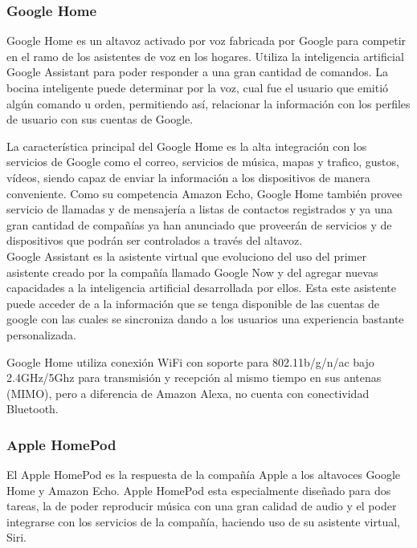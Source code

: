 \subsubsection{Google Home}
Google Home es un altavoz activado por voz fabricada por  Google para competir en el ramo de los asistentes de voz en los hogares. Utiliza la inteligencia artificial Google Assistant para poder responder a una gran cantidad de comandos.\cite{googleHome} La bocina inteligente puede determinar por la voz, cual fue el usuario que emitió algún comando u orden, permitiendo así, relacionar la información con los perfiles de usuario con sus cuentas de Google.

La característica principal del Google Home es la alta integración con los servicios de Google como el correo, servicios de música, mapas y trafico, gustos, vídeos, siendo capaz de enviar la información a los dispositivos de manera conveniente. Como su competencia Amazon Echo, Google Home también provee servicio de llamadas y de mensajería a listas de contactos registrados y ya una gran cantidad de compañías  ya han anunciado que proveerán de servicios y de dispositivos que podrán ser controlados a través del altavoz.\\

Google Assistant es la asistente virtual que evoluciono del uso del primer asistente creado por la compañía llamado Google Now y del agregar nuevas capacidades a la inteligencia artificial desarrollada por ellos. Esta este asistente puede acceder de a la información que se tenga  disponible de las cuentas de google con las cuales se sincroniza dando a los usuarios una experiencia bastante personalizada.

Google Home utiliza conexión WiFi con soporte para 802.11b/g/n/ac bajo 2.4GHz/5Ghz para transmisión y recepción al mismo tiempo en sus antenas (MIMO), pero a diferencia de Amazon Alexa, no cuenta con conectividad Bluetooth.\\ 

\subsubsection{Apple HomePod}
El Apple HomePod es la respuesta de la compañía Apple a los altavoces Google Home y Amazon Echo. Apple HomePod esta especialmente diseñado para dos tareas, la de poder reproducir música con una gran calidad de audio y el poder integrarse con los servicios de la compañía, haciendo uso de su asistente virtual, Siri. \\

